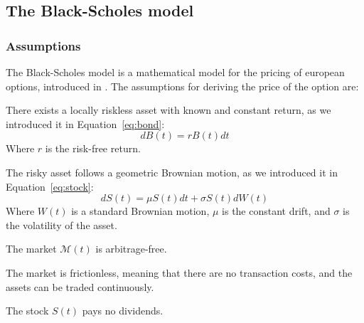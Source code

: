 





\subsection{The Black-Scholes model}
\subsubsection{Assumptions}
The Black-Scholes model is a mathematical model for the pricing of european options, introduced in \cite{black_scholes}. The assumptions for deriving the price of the option are:
\begin{assumption}
    There exists a locally riskless asset with known and constant return, as we introduced it in Equation~\ref{eq:bond}: 
        $$
            dB(t) = r B(t) dt
        $$
        Where $r$ is the risk-free return.
\end{assumption}

\begin{assumption}
    \label{ass:gbm}The risky asset follows a geometric Brownian motion, as we introduced it in Equation~\ref{eq:stock}:
    $$
        dS(t) = \mu S(t) dt + \sigma S(t) dW(t)
    $$
    Where $W(t)$ is a standard Brownian motion, $\mu$ is the constant drift, and $\sigma$ is the volatility of the asset.
\end{assumption}

\begin{assumption}
    The market $\mathcal{M}(t)$ is arbitrage-free.
\end{assumption}

\begin{assumption}
    The market is frictionless, meaning that there are no transaction costs, and the assets can be traded continuously.
\end{assumption}

\begin{assumption}
    The stock $S(t)$ pays no dividends.
\end{assumption}


